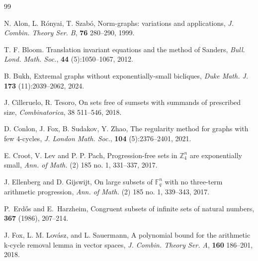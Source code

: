\documentclass[A4paper,reqno,oneside,12pt]{amsart}
\theoremstyle{plain}
\theoremstyle{definition}
\begin{document}
\begin{thebibliography}{99}


 N. Alon, L. R\'onyai, T. Szab\'o, Norm-graphs: variations and applications, {\it{J. Combin. Theory Ser. B}}, {\bf{76}} 280--290, 1999.

 T. F. Bloom. Translation invariant equations and the method of
Sanders, {\it Bull. Lond. Math. Soc.}, {\bf 44} (5):1050--1067, 2012.



 B. Bukh, Extremal graphs without exponentially-small bicliques, \emph{Duke Math. J.} {\bf 173} (11):2039--2062, 2024. 


 J. Cilleruelo, R. Tesoro, On sets free of sumsets with summands of prescribed size, {\it{Combinatorica}}, 38  511--546, 2018.

 D. Conlon, J. Fox, B. Sudakov, Y. Zhao, The regularity method for graphs with few 4-cycles, {\it{J. London Math. Soc.}}, {\bf 104} (5):2376--2401, 2021.

 E. Croot, V. Lev and P. P. Pach, Progression-free sets in $\mathbb Z_4^n$ are exponentially small, \textit{Ann. of Math.} (2) 185 no. 1, 331--337, 2017.

 J. Ellenberg and D. Gijswijt, On large subsets of $\mathbb F_q^n$ with no three-term arithmetic progression, \textit{Ann. of Math.} (2) 185 no. 1, 339--343, 2017.

P.~Erd{\H{o}}s and E.~Harzheim,
\newblock Congruent subsets of infinite sets of natural numbers,
 {\bf 367} (1986), 207--214.

 J. Fox, L. M. Lov\'asz, and L. Sauermann, A polynomial bound for the arithmetic k-cycle removal lemma in vector spaces, {\it{J. Combin. Theory Ser. A}}, {\bf{160}} 186--201, 2018.


\end{thebibliography}
\end{document}
